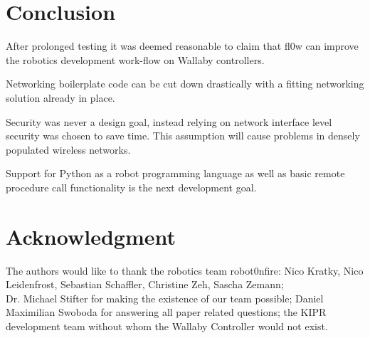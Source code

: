 \documentclass[conference]{IEEEtran}
\begin{document}
\section{Conclusion}

After prolonged testing it was deemed reasonable to claim that fl0w\cite{fl0w:Philip Trauner} can improve the robotics development work-flow on Wallaby\cite{Wallaby Controller:KIPR} controllers.

Networking boilerplate code can be cut down drastically with a fitting networking solution already in place.

Security was never a design goal, instead relying on network interface level security was chosen to save time. This assumption will cause problems in densely populated wireless networks.

Support for Python\cite{Python:Python Foundation} as a robot programming language as well as basic remote procedure call functionality is the next development goal.

\section*{Acknowledgment}
The authors would like to thank the robotics team robot0nfire: Nico Kratky, Nico Leidenfrost, Sebastian Schaffler, Christine Zeh, Sascha Zemann;\\ Dr. Michael Stifter for making the existence of our team possible; Daniel Maximilian Swoboda for answering all paper related questions; the KIPR development team without whom the Wallaby\cite{Wallaby Controller:KIPR} Controller would not exist.
\end{document}
